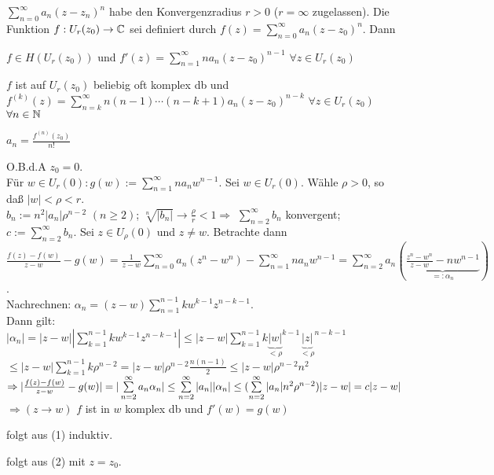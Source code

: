 \documentclass[a4paper,twoside,DIV15,BCOR12mm]{scrbook}
\begin{document}
\begin{satz}
$\sum\limits_{n=0}^{\infty} a_n(z-z_n)^n$ habe den Konvergenzradius $r > 0$ ($r = \infty$ zugelassen). Die Funktion
$f: U_r(z_0) \to \mathbb{C}$  sei definiert durch $f(z) = \sum\limits_{n=0}^{\infty} a_n(z-z_0)^n$. Dann
\begin{liste}
\item $f\in H(U_r(z_0))$ und $f'(z) = \sum\limits_{n=1}^{\infty} na_n(z-z_0)^{n-1}$ $\forall z \in U_r(z_0)$
\item $f$ ist auf $U_r(z_0)$ beliebig oft komplex db und \\ $f^{(k)}(z) = \sum\limits_{n=k}^{\infty} n(n-1) \cdots (n-k+1)a_n(z-z_0)^{n-k}$ $\forall z \in U_r(z_0)$ $\forall n \in \mathbb{N}$
\item $a_n = \frac{f^{(n)}(z_0)}{n!}$
\end{liste}
\end{satz}
\begin{beweis}
\begin{liste}
\item O.B.d.A $z_0 = 0$. \\
      Für $w \in U_r(0) : g(w) := \sum\limits_{n=1}^{\infty} na_nw^{n-1}$. Sei $w \in U_r(0).$ Wähle $\rho > 0$, so daß
      $|w| < \rho < r$. \\
      $b_n := n^2 |a_n| \rho^{n-2} $ $(n \geq 2)$; $\sqrt[n]{|b_n|} \to \frac{\rho}{r} < 1 \Rightarrow $ 
      $\sum\limits_{n=2}^{\infty} b_n$ konvergent; $c := \sum\limits_{n=2}^{\infty} b_n $. 
      Sei $z \in U_{\rho}(0)$ und $z \neq w$. Betrachte dann \\
      $ \frac{f(z)-f(w)}{z-w} - g(w) = \frac{1}{z-w} \sum\limits_{n=0}^{\infty} a_n (z^n-w^n) - \sum\limits_{n=1}^{\infty} na_nw^{n-1} 
      = \sum\limits_{n=2}^{\infty} a_n(\underbrace{\frac{z^n-w^n}{z-w}-nw^{n-1}}_{=: \alpha_n})$.\\
	  Nachrechnen: $\alpha_n = (z-w) \sum\limits_{n=1}^{n-1} k w^{k-1}z^{n-k-1}$.\\ Dann gilt: \\
	  $ |\alpha_n| = |z-w| |\sum\limits_{k=1}^{n-1} k w^{k-1}z^{n-k-1}| \leq 
	  |z-w| \sum\limits_{k=1}^{n-1} k {\underbrace{|w|}_{< \rho}} ^{k-1}{\underbrace{|z|}_{<\rho}} ^{n-k-1} $ \\ 
      $ \leq |z-w| \sum\limits_{k=1}^{n-1} k \rho^{n-2} = |z-w| \rho^{n-2} \frac{n(n-1)}{2} \leq |z-w| \rho^{n-2} n^2 $ \\
	  $ \Rightarrow |\frac{f(z)-f(w)}{z-w} - g(w)| = |\sum\limits_{n=2}^{\infty} a_n \alpha_n| \leq \sum\limits_{n=2}^{\infty} |a_n| |\alpha_n| \\
	  \leq (\sum\limits_{n=2}^{\infty}  |a_n| n^2 \rho^{n-2})|z-w| = c|z-w| $ \\
	  $\Rightarrow (z \to w)$ $f$ ist in $w$ komplex db und $f'(w) = g(w)$
	  \item folgt aus (1) induktiv.
	  \item folgt aus (2) mit $z = z_0$.
\end{liste}
\end{beweis}
\end{document}
